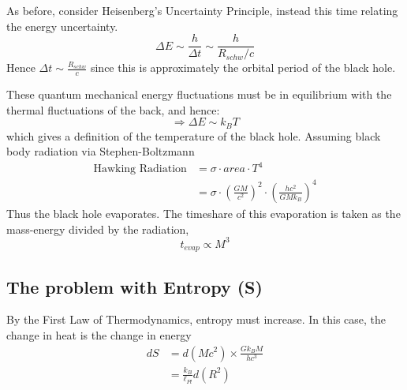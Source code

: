 \par As before, consider Heisenberg's Uncertainty Principle, instead this time relating the energy uncertainty. 
$$ \Delta E \sim \frac{h}{\Delta t} \sim \frac{h}{R_{schw} / c} $$
Hence  $\Delta t \sim \frac{R_{schw}}{c}$ since this is approximately the orbital period of the black hole. \par These quantum mechanical energy fluctuations must be in equilibrium with the thermal fluctuations of the back, and hence:
$$ \Rightarrow \Delta E \sim k_B T $$
which gives a definition of the temperature of the black hole. Assuming black body radiation via Stephen-Boltzmann
\begin{align*}
    \text{Hawking Radiation} & = \sigma \cdot area \cdot T^4 \\ & = \sigma \cdot \left(\frac{GM}{c^2}\right)^2 \cdot \left(\frac{hc^2}{GMk_B}\right)^4
\end{align*}
Thus the black hole evaporates. The timeshare of this evaporation is taken as the mass-energy divided by the radiation,
$$t_{evap} \propto M^3 $$

\subsection{The problem with Entropy (S)}
By the First Law of Thermodynamics, entropy must increase. In this case, the change in heat is the change in energy\begin{align*}
    dS & = d(Mc^2) \times \frac{Gk_B M}{h c^3} \\ & = \frac{k_B}{\ell_{Pl}} d(R^2)
\end{align*}
